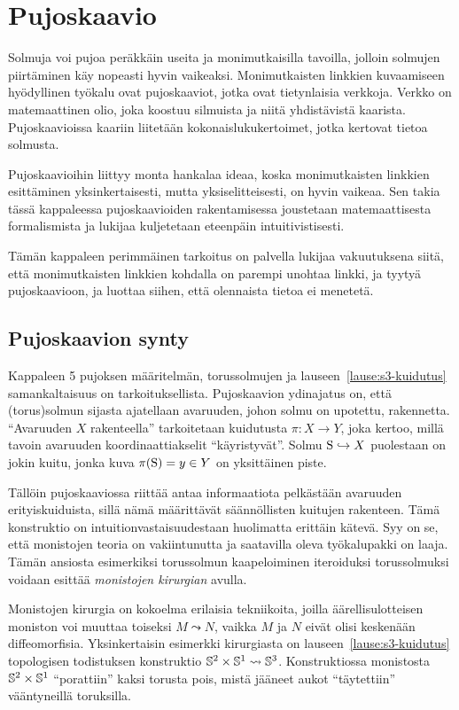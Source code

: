 \section{Pujoskaavio}
\label{kpl:pujoskaavio}
Solmuja voi pujoa peräkkäin useita ja monimutkaisilla tavoilla, jolloin solmujen piirtäminen käy nopeasti hyvin vaikeaksi. Monimutkaisten linkkien kuvaamiseen hyödyllinen työkalu ovat pujoskaaviot, jotka ovat tietynlaisia verkkoja. Verkko on matemaattinen olio, joka koostuu silmuista ja niitä yhdistävistä kaarista. Pujoskaavioissa kaariin liitetään kokonaislukukertoimet, jotka kertovat tietoa solmusta.

Pujoskaavioihin liittyy monta hankalaa ideaa, koska monimutkaisten linkkien esittäminen yksinkertaisesti, mutta yksiselitteisesti, on hyvin vaikeaa. Sen takia tässä kappaleessa pujoskaavioiden rakentamisessa joustetaan matemaattisesta formalismista ja lukijaa kuljetetaan eteenpäin intuitivistisesti.

Tämän kappaleen perimmäinen tarkoitus on palvella lukijaa vakuutuksena siitä, että monimutkaisten linkkien kohdalla on parempi unohtaa linkki, ja tyytyä pujoskaavioon, ja luottaa siihen, että olennaista tietoa ei menetetä.

\subsection{Pujoskaavion synty}
\label{kpl:pujoskaavion-synty}
Kappaleen 5 pujoksen määritelmän, torussolmujen ja lauseen~\ref{lause:s3-kuidutus} samankaltaisuus on tarkoituksellista. Pujoskaavion ydinajatus on, että (torus)solmun sijasta ajatellaan avaruuden, johon solmu on upotettu, rakennetta. ``Avaruuden $X$ rakenteella'' tarkoitetaan  kuidutusta $\pi:X\to Y$, joka kertoo, millä tavoin avaruuden koordinaattiakselit ``käyristyvät''. Solmu $\solmu\hookrightarrow X$ puolestaan on jokin kuitu, jonka kuva $\pi(\solmu)=y\in Y$ on yksittäinen piste.

Tällöin pujoskaaviossa riittää antaa informaatiota pelkästään avaruuden erityiskuiduista, sillä nämä määrittävät säännöllisten kuitujen rakenteen. Tämä konstruktio on intuitionvastaisuudestaan huolimatta erittäin kätevä. Syy on se, että monistojen teoria on vakiintunutta ja saatavilla oleva työkalupakki on laaja. Tämän ansiosta esimerkiksi torussolmun kaapeloiminen iteroiduksi torussolmuksi voidaan esittää \emph{monistojen kirurgian} avulla.

Monistojen kirurgia on kokoelma erilaisia tekniikoita, joilla äärellisulotteisen moniston voi muuttaa toiseksi $M\leadsto N$, vaikka $M$ ja $N$ eivät olisi keskenään diffeomorfisia. Yksinkertaisin esimerkki kirurgiasta on lauseen~\ref{lause:s3-kuidutus} topologisen todistuksen konstruktio $\S^2\times\S^1\leadsto\S^3$. Konstruktiossa monistosta $\S^2\times\S^1$ ``porattiin'' kaksi torusta pois, mistä jääneet aukot ``täytettiin'' vääntyneillä toruksilla.

